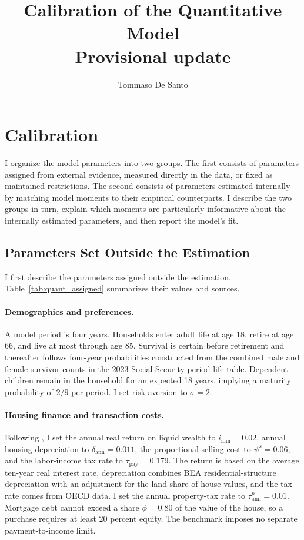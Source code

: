 \documentclass[11pt]{article}
\title{Calibration of the Quantitative Model\\
\large Provisional update}
\author{Tommaso De Santo}
\date{}
\begin{document}
\maketitle

\section{Calibration}
\label{sec:quant_calibration}

I organize the model parameters into two groups. The first consists of
parameters assigned from external evidence, measured directly in the data, or
fixed as maintained restrictions. The second consists of parameters estimated
internally by matching model moments to their empirical counterparts. I describe
the two groups in turn, explain which moments are particularly informative
about the internally estimated parameters, and then report the model's fit.

\subsection{Parameters Set Outside the Estimation}

I first describe the parameters assigned outside the estimation.
Table~\ref{tab:quant_assigned} summarizes their values and sources.

\paragraph{Demographics and preferences.}
A model period is four years. Households enter adult life at age 18, retire at
age 66, and live at most through age 85. Survival is certain before retirement
and thereafter follows four-year probabilities constructed from the combined
male and female survivor counts in the 2023 Social Security period life table.
Dependent children remain in the household for an expected 18 years, implying
a maturity probability of $2/9$ per period. I set risk aversion to $\sigma=2$.

\paragraph{Housing finance and transaction costs.}
Following \citet{greaneyDynamicUrbanEconomics2025}, I set the annual real
return on liquid wealth to $i_{\mathrm{ann}}=0.02$, annual housing depreciation
to $\delta_{\mathrm{ann}}=0.011$, the proportional selling cost to
$\psi^s=0.06$, and the labor-income tax rate to
$\tau_{\mathrm{pay}}=0.179$. The return is based on the average ten-year real
interest rate, depreciation combines BEA residential-structure depreciation
with an adjustment for the land share of house values, and the tax rate comes
from OECD data. I set the annual property-tax rate to
$\tau^p_{\mathrm{ann}}=0.01$. Mortgage debt cannot exceed a share $\phi=0.80$
of the value of the house, so a purchase requires at least 20 percent equity.
The benchmark imposes no separate payment-to-income limit.
\end{document}
